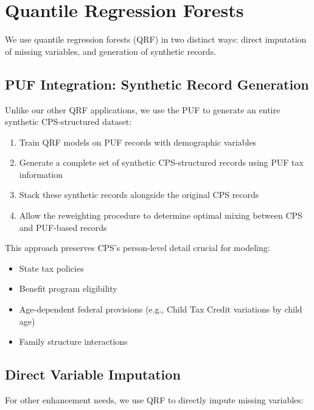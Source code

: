\section{Quantile Regression Forests}\label{sec:qrf}

We use quantile regression forests (QRF) in two distinct ways: direct imputation of missing variables, and generation of synthetic records.

\subsection{PUF Integration: Synthetic Record Generation}

Unlike our other QRF applications, we use the PUF to generate an entire synthetic CPS-structured dataset:

\begin{enumerate}
    \item Train QRF models on PUF records with demographic variables
    \item Generate a complete set of synthetic CPS-structured records using PUF tax information
    \item Stack these synthetic records alongside the original CPS records
    \item Allow the reweighting procedure to determine optimal mixing between CPS and PUF-based records
\end{enumerate}

This approach preserves CPS's person-level detail crucial for modeling:
\begin{itemize}
    \item State tax policies
    \item Benefit program eligibility
    \item Age-dependent federal provisions (e.g., Child Tax Credit variations by child age)
    \item Family structure interactions
\end{itemize}

\subsection{Direct Variable Imputation}

For other enhancement needs, we use QRF to directly impute missing variables:

